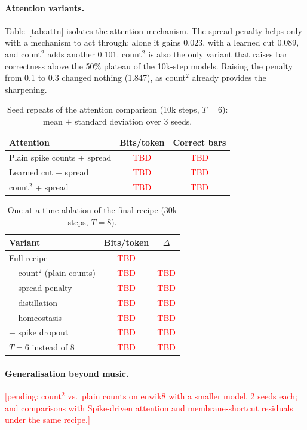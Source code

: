 \documentclass[10pt]{article}
\newcommand{\pending}[1]{\textcolor{red}{[pending: #1]}}
\newcommand{\tbd}{\textcolor{red}{TBD}}
\newcommand{\csq}{count$^2$}
\begin{document}
\paragraph{Attention variants.} Table~\ref{tab:attn} isolates the attention mechanism. The spread penalty helps
only with a mechanism to act through: alone it gains 0.023, with a learned cut 0.089, and \csq{} adds another
0.101. \csq{} is also the only variant that raises bar correctness above the 50\% plateau of the 10k-step models.
Raising the penalty from 0.1 to 0.3 changed nothing (1.847), as \csq{} already provides the sharpening.

\begin{table}[t]
\centering
\caption{Seed repeats of the attention comparison (10k steps, $T=6$): mean $\pm$ standard deviation over 3 seeds.}
\label{tab:seeds}
\small
\begin{tabular}{lcc}
\toprule
Attention & Bits/token & Correct bars \\
\midrule
Plain spike counts + spread & \tbd & \tbd \\
Learned cut + spread & \tbd & \tbd \\
\csq{} + spread & \tbd & \tbd \\
\bottomrule
\end{tabular}
\end{table}

\begin{table}[t]
\centering
\caption{One-at-a-time ablation of the final recipe (30k steps, $T=8$).}
\label{tab:ablation}
\small
\begin{tabular}{lcc}
\toprule
Variant & Bits/token & $\Delta$ \\
\midrule
Full recipe & \tbd & --- \\
$-$ \csq{} (plain counts) & \tbd & \tbd \\
$-$ spread penalty & \tbd & \tbd \\
$-$ distillation & \tbd & \tbd \\
$-$ homeostasis & \tbd & \tbd \\
$-$ spike dropout & \tbd & \tbd \\
$T=6$ instead of 8 & \tbd & \tbd \\
\bottomrule
\end{tabular}
\end{table}

\paragraph{Generalisation beyond music.} \pending{\csq{} vs.\ plain counts on enwik8 with a smaller model, 2 seeds
each; and comparisons with Spike-driven attention \citep{yao2023spikedriven} and membrane-shortcut residuals
\citep{zhou2023spikingformer} under the same recipe.}
\end{document}
